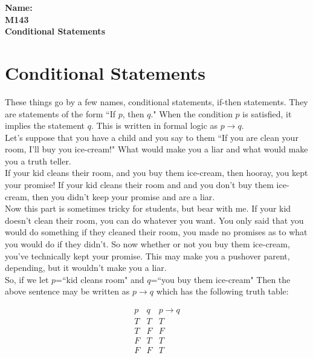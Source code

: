 \documentclass[10pt]{article}
\theoremstyle{definition}
\begin{document}
%

{\bf Name:} \hrulefill\hrulefill\hrulefill\\
{\bf M143} \qquad \qquad \\
{\bf Conditional Statements}\\ %



\section{Conditional Statements}

These things go by a few names, conditional statements, if-then statements.  They are statements of the form ``If $p$, then $q$."  When the condition $p$ is satisfied, it implies the statement $q$.  This is written in formal logic as $p\to q.$\\


Let's suppose that you have a child and you say to them ``If you are clean your room, I'll buy you ice-cream!"  What would make you a liar and what would make you a truth teller.\\

If your kid cleans their room, and you buy them ice-cream, then hooray, you kept your promise!  If your kid cleans their room and and you don't buy them ice-cream, then you didn't keep your promise and are a liar.\\

Now this part is sometimes tricky for students, but bear with me.  If your kid doesn't clean their room, you can do whatever you want.  You only said that you would do something if they cleaned their room, you made no promises as to what you would do if they didn't.  So now whether or not you buy them ice-cream, you've technically kept your promise.  This may make you a pushover parent, depending, but it wouldn't make you a liar.\\

So, if we let $p$=``kid cleans room" and $q$=``you buy them ice-cream"  Then the above sentence may be written as $p\to q$ which has the following truth table:

$$
\begin{array}{c|c|c}
p&q&p\to q\\
\hline
T&T&T\\
T&F&F\\
F&T&T\\
F&F&T
\end{array}
$$
\end{document}
